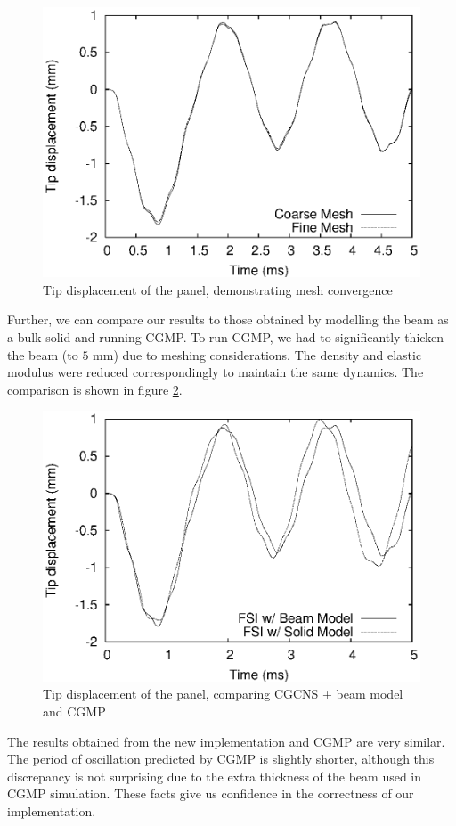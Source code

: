 \documentclass{article}
\begin{document}
\begin{figure}[ht]
        \centering
        \includegraphics[width=\textwidth]{beam_in_channel2} 
        \caption{Tip displacement of the panel, demonstrating mesh convergence}
        \label{fig:BeamInChannelTip2}
\end{figure}
Further, we can compare our results to those obtained by modelling the beam as a bulk solid and running CGMP.  
To run CGMP, we had to significantly thicken the beam (to $5 \mbox{ mm}$) due to meshing considerations. 
The density and elastic modulus were reduced correspondingly to maintain the same dynamics.
The comparison is shown in figure \ref{fig:BeamInChannelTip3}.
\begin{figure}[ht]
        \centering
        \includegraphics[width=\textwidth]{beam_in_channel3} 
        \caption{Tip displacement of the panel, comparing CGCNS + beam model and CGMP}
        \label{fig:BeamInChannelTip3}
\end{figure}
The results obtained from the new implementation and CGMP are very similar.  
The period of oscillation predicted by CGMP is slightly shorter, although this discrepancy is not surprising due to the extra thickness of the beam used in CGMP simulation.
These facts give us confidence in the correctness of our implementation.
\end{document}
